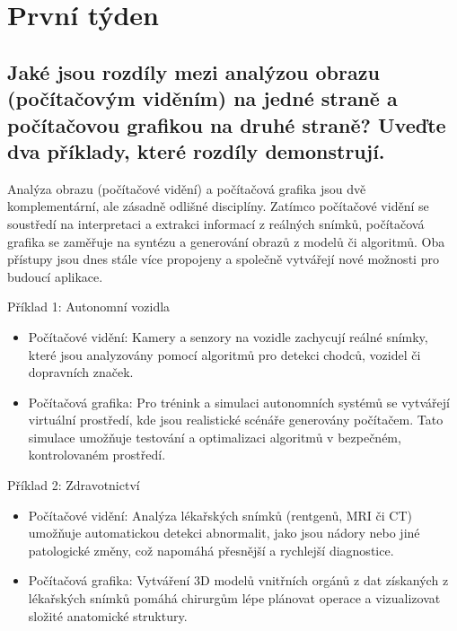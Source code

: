 \section{První týden}

\subsection{Jaké jsou rozdíly mezi analýzou obrazu (počítačovým viděním) na jedné straně a počítačovou grafikou na druhé 
straně? Uveďte dva příklady, které rozdíly demonstrují.}

Analýza obrazu (počítačové vidění) a počítačová grafika jsou dvě komplementární, ale zásadně odlišné disciplíny. Zatímco 
počítačové vidění se soustředí na interpretaci a extrakci informací z reálných snímků, počítačová grafika se zaměřuje na 
syntézu a generování obrazů z modelů či algoritmů. Oba přístupy jsou dnes stále více propojeny a společně vytvářejí nové 
možnosti pro budoucí aplikace.

Příklad 1: Autonomní vozidla
\begin{itemize}
    \item Počítačové vidění: Kamery a senzory na vozidle zachycují reálné snímky, které jsou analyzovány pomocí 
    algoritmů pro detekci chodců, vozidel či dopravních značek.
    \item Počítačová grafika: Pro trénink a simulaci autonomních systémů se vytvářejí virtuální prostředí, kde jsou 
    realistické scénáře generovány počítačem. Tato simulace umožňuje testování a optimalizaci algoritmů v bezpečném, 
    kontrolovaném prostředí.
\end{itemize}


Příklad 2: Zdravotnictví
\begin{itemize}
    \item Počítačové vidění: Analýza lékařských snímků (rentgenů, MRI či CT) umožňuje automatickou detekci abnormalit, 
    jako jsou nádory nebo jiné patologické změny, což napomáhá přesnější a rychlejší diagnostice.
    \item Počítačová grafika: Vytváření 3D modelů vnitřních orgánů z dat získaných z lékařských snímků pomáhá chirurgům 
    lépe plánovat operace a vizualizovat složité anatomické struktury.
\end{itemize}

\subsection{}